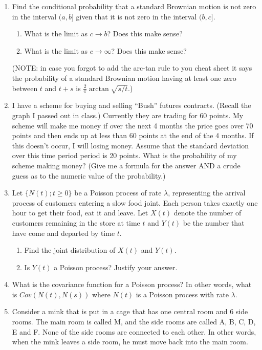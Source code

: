 \documentclass[12pt]{article}
\begin{document}
\begin{enumerate}

\item Find the conditional probability that a standard Brownian motion
is not zero in the interval $(a,b]$ given that it is not zero in the
interval $(b,c]$. 
\begin{enumerate}
\item What is the limit as $c \to b$?  Does this make sense?
\item What is the limit as $c \to \infty$?  Does this make sense?
\end{enumerate}
(NOTE: in case you forgot to add the arc-tan rule to
you cheat sheet it says the probability of a standard Brownian motion
having at least one zero between $t$ and $t+s$ is $\frac{2}{\pi}
\arctan\sqrt{s/t}$.)

\item I have a scheme for buying and selling ``Bush'' futures
contracts.  (Recall the graph I passed out in class.)  Currently they
are trading for 60 points.  My scheme will make me money if over the
next 4 months the price goes over 70 points and then ends up at less
than 60 points at the end of the 4 months.  If this doesn't occur, I
will losing money.  Assume that the standard deviation over this time
period period is 20 points.  What is the probability of my scheme
making money?  (Give me a formula for the answer AND a crude guess as
to the numeric value of the probability.)


\item Let $\{N(t); t\ge 0\}$ be a Poisson process of rate $\lambda$,
representing the arrival process of customers entering a slow food
joint.  Each person takes exactly one hour to get their food, eat it
and leave.  Let $X(t)$ denote the number of customers remaining in the
store at time $t$ and $Y(t)$ be the number that have come and departed
by time $t$.
\begin{enumerate}
\item Find the joint distribution of $X(t)$ and $Y(t)$.
\item Is $Y(t)$ a Poisson process?  Justify your answer.
\end{enumerate}

\item What is the covariance function for a Poisson process?  In other
words, what is $Cov(N(t),N(s))$ where $N(t)$ is a Poisson process with
rate $\lambda$.

\item Consider a mink that is put in a cage that has one central room
and 6 side rooms.  The main room is called M, and the side rooms are
called A, B, C, D, E and F.  None of the side rooms are connected to
each other.  In other words, when the mink leaves a side room, he must
move back into the main room.


\end{enumerate}
\end{document}
